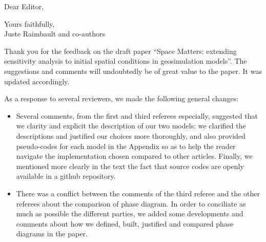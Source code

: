 \documentclass[11pt,a4paper,sans]{moderncv}        %
\begin{document}
\date{\today}
\opening{Dear Editor,}
\closing{Yours faithfully,\\
Juste Raimbault and co-authors%
}




\justify


Thank you for the feedback on the draft paper ``Space Matters: extending sensitivity analysis to initial spatial conditions in geosimulation models''. The suggestions and comments will undoubtedly be of great value to the paper. It was updated accordingly.

\medskip







As a response to several reviewers, we made the following general changes:

\begin{itemize}
	\item Several comments, from the first and third referees especially, suggested that we clarity and explicit the description of our two models: we clarified the descriptions and justified our choices more thoroughly, and also provided pseudo-codes for each model in the Appendix so as to help the reader navigate the implementation chosen compared to other articles. Finally, we mentioned more clearly in the text the fact that source codes are openly available in a github repository.
    \item There was a conflict between the comments of the third referee and the other referees about the comparison of phase diagram. In order to conciliate as much as possible the different parties, we added some developments and comments about how we defined, built, justified and compared phase diagrams in the paper.
    \end{itemize}
\end{document}
